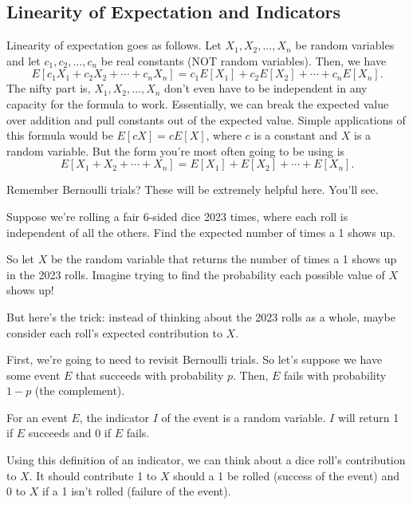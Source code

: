 \documentclass[11pt]{scrartcl}
\begin{document}
\subsection{Linearity of Expectation and Indicators}

Linearity of expectation goes as follows. Let $X_1, X_2, ..., X_n$ be random variables and let $c_1, c_2, ..., c_n$ be real constants (NOT random variables). Then, we have \[E[c_1X_1 + c_2X_2 + \cdots + c_nX_n] = c_1E[X_1] + c_2E[X_2] + \cdots + c_nE[X_n].\] The nifty part is, $X_1, X_2, ..., X_n$ don't even have to be independent in any capacity for the formula to work. Essentially, we can break the expected value over addition and pull constants out of the expected value. Simple applications of this formula would be $E[cX] = cE[X]$, where $c$ is a constant and $X$ is a random variable. But the form you're most often going to be using is \[E[X_1 + X_2 + \cdots + X_n] = E[X_1] + E[X_2] + \cdots + E[X_n].\]

Remember Bernoulli trials? These will be extremely helpful here. You'll see.

\begin{example}
Suppose we're rolling a fair 6-sided dice 2023 times, where each roll is independent of all the others. Find the expected number of times a 1 shows up.
\end{example}

So let $X$ be the random variable that returns the number of times a 1 shows up in the 2023 rolls. Imagine trying to find the probability each possible value of $X$ shows up!

But here's the trick: instead of thinking about the 2023 rolls as a whole, maybe consider each roll's expected contribution to $X$.

First, we're going to need to revisit Bernoulli trials. So let's suppose we have some event $E$ that succeeds with probability $p$. Then, $E$ fails with probability $1 - p$ (the complement).

\begin{definition}[Indicator]
For an event $E$, the indicator $I$ of the event is a random variable. $I$ will return 1 if $E$ succeeds and 0 if $E$ fails.
\end{definition}

Using this definition of an indicator, we can think about a dice roll's contribution to $X$. It should contribute 1 to $X$ should a 1 be rolled (success of the event) and 0 to $X$ if a 1 isn't rolled (failure of the event).
\end{document}
